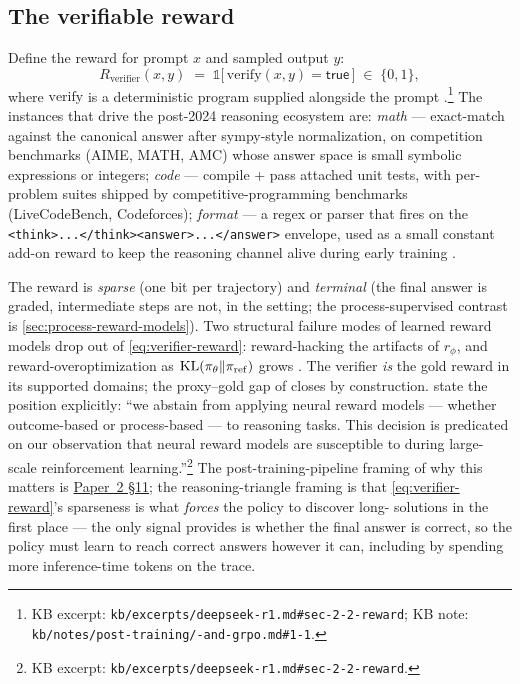 \subsection{The verifiable reward}
\label{sec:rlvr-verifier-reward}

Define the reward for prompt $x$ and sampled output $y$:
\begin{equation}
R_{\mathrm{verifier}}(x, y) \;=\; \mathbb{1}\!\big[\,\mathrm{verify}(x, y) = \mathsf{true}\,\big] \;\in\; \{0, 1\},
\label{eq:verifier-reward}
\end{equation}
where $\mathrm{verify}$ is a deterministic program supplied alongside
the prompt \citep[\S 2.2]{deepseek-r1}.\footnote{KB excerpt:
\texttt{kb/excerpts/deepseek-r1.md\#sec-2-2-reward}; KB note:
\texttt{kb/notes/post-training/-and-grpo.md\#1-1}.} The instances
that drive the post-2024 reasoning ecosystem are: \emph{math} ---
exact-match against the canonical answer after sympy-style
normalization, on competition benchmarks (AIME, MATH, AMC) whose
answer space is small symbolic expressions or integers; \emph{code}
--- compile + pass attached unit tests, with per-problem suites shipped
by competitive-programming benchmarks (LiveCodeBench, Codeforces);
\emph{format} --- a regex or parser that fires on the
\texttt{<think>...</think><answer>...</answer>} envelope, used as a
small constant add-on reward to keep the reasoning channel alive during
early training \citep[\S 2.2]{deepseek-r1}.

The reward is \emph{sparse} (one bit per trajectory) and \emph{terminal}
(the final answer is graded, intermediate steps are not, in the 
setting; the process-supervised contrast is
\cref{sec:process-reward-models}). Two structural failure modes of
learned reward models drop out of \cref{eq:verifier-reward}:
reward-hacking the artifacts of $r_\phi$, and reward-overoptimization
as $\operatorname{KL}(\pi_\theta\|\pi_\mathrm{ref})$ grows \citep[scaling laws for
overoptimization]{ouyang2022-instructgpt}. The verifier
\emph{is} the gold reward in its supported domains; the proxy--gold gap
of  closes by construction. \citet[\S 2.2]{deepseek-r1} state the
position explicitly: ``we abstain from applying neural reward models
--- whether outcome-based or process-based --- to reasoning tasks. This
decision is predicated on our observation that neural reward models are
susceptible to  during large-scale reinforcement
learning.''\footnote{KB excerpt:
\texttt{kb/excerpts/deepseek-r1.md\#sec-2-2-reward}.} The
post-training-pipeline framing of why this matters is
\hyperref[P2-sec:rlvr-grpo]{Paper~2 §11}; the reasoning-triangle framing is that
\cref{eq:verifier-reward}'s sparseness is what \emph{forces} the policy
to discover long- solutions in the first place --- the only signal
 provides is whether the final answer is correct, so the policy
must learn to reach correct answers however it can, including by
spending more inference-time tokens on the trace.

